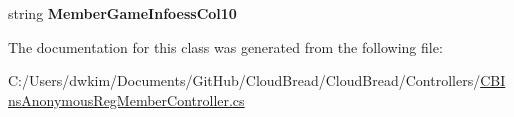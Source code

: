 \begin{DoxyCompactItemize}
\item 
string {\bfseries Member\+Game\+Infoess\+Col10}\hypertarget{class_cloud_bread_1_1_controllers_1_1_c_b_ins_anonymous_reg_member_controller_1_1_input_params_a0fba3e170df012a1d4ab0ded4cf19e44}{}\label{class_cloud_bread_1_1_controllers_1_1_c_b_ins_anonymous_reg_member_controller_1_1_input_params_a0fba3e170df012a1d4ab0ded4cf19e44}

\end{DoxyCompactItemize}


The documentation for this class was generated from the following file\+:\begin{DoxyCompactItemize}
\item 
C\+:/\+Users/dwkim/\+Documents/\+Git\+Hub/\+Cloud\+Bread/\+Cloud\+Bread/\+Controllers/\hyperlink{_c_b_ins_anonymous_reg_member_controller_8cs}{C\+B\+Ins\+Anonymous\+Reg\+Member\+Controller.\+cs}\end{DoxyCompactItemize}
